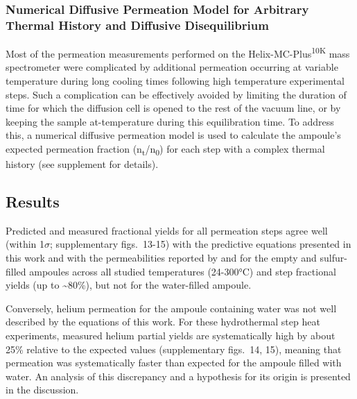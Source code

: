 \subsubsection{Numerical Diffusive Permeation Model for Arbitrary Thermal History and Diffusive Disequilibrium}\label{numerical-diffusive-permeation-model-for-arbitrary-thermally-history-and-diffusive-disequilibrium}

Most of the permeation measurements performed on the Helix-MC-Plus\textsuperscript{10K} mass spectrometer were complicated by additional permeation occurring at variable temperature during long cooling times following high temperature experimental steps. Such a complication can be effectively avoided by limiting the duration of time for which the diffusion cell is opened to the rest of the vacuum line, or by keeping the sample at-temperature during this equilibration time. To address this, a numerical diffusive permeation model is used to calculate the ampoule's expected permeation fraction (n\textsubscript{t}/n\textsubscript{0}) for each step with a complex thermal history (see supplement for details).

\subsection{Results}\label{results}

Predicted and measured fractional yields for all permeation steps agree well (within 1$\sigma$; supplementary figs.~13-15) with the predictive equations presented in this work and with the permeabilities reported by \citet{swets1961} and \citet{jones1953} for the empty and sulfur-filled ampoules across all studied temperatures (24-300°C) and step fractional yields (up to \textasciitilde80\%), but not for the water-filled ampoule.

Conversely, helium permeation for the ampoule containing water was not well described by the equations of this work. For these hydrothermal step heat experiments, measured helium partial yields are systematically high by about 25\% relative to the expected values (supplementary figs.~14, 15), meaning that permeation was systematically faster than expected for the ampoule filled with water. An analysis of this discrepancy and a hypothesis for its origin is presented in the discussion.

